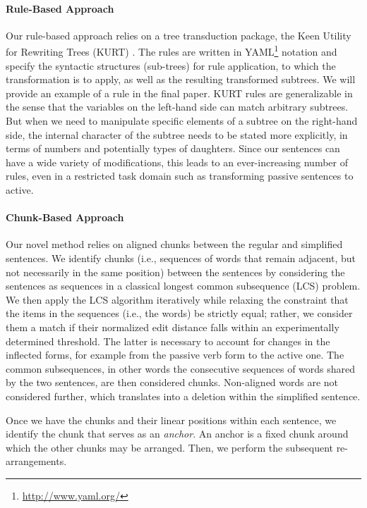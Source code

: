 \documentclass[a4paper,11pt]{article}
\begin{document}
\paragraph{Rule-Based Approach}
Our rule-based approach relies on a tree transduction package, the Keen Utility for Rewriting Trees (KURT) \cite{rudnick:12}. The rules are written in YAML\footnote{\url{http://www.yaml.org/}} notation and specify the syntactic structures (sub-trees) for rule application, to which the transformation is to apply, as well as the resulting transformed subtrees.  We will provide an example of a rule in the final paper.
KURT rules are generalizable in the sense that the variables on the left-hand side can match arbitrary subtrees.  But when we need to manipulate specific elements of a subtree on the right-hand side, the internal character of the subtree needs to be stated more explicitly, in terms of numbers and potentially types of daughters.  Since our sentences can have a wide variety of modifications, this leads to an ever-increasing number of rules, even in a restricted task domain such as transforming passive sentences to active.

\paragraph{Chunk-Based Approach}


Our novel method relies on aligned chunks between the regular and simplified sentences.  We identify chunks (i.e., sequences of words that remain adjacent, but not necessarily in the same position) between the sentences by considering the sentences as sequences in a classical longest common subsequence (LCS) problem. We then apply the LCS algorithm \cite{hirschberg:75} iteratively while relaxing the constraint that the items in the sequences (i.e., the words) be strictly equal; rather, we consider them a match if their normalized edit distance \cite{levenshtein:66} falls within an experimentally determined threshold. The latter is necessary to account for changes in the inflected forms, for example from the passive verb form to the active one. The common subsequences, in other words the consecutive sequences of words shared by the two sentences, are then considered chunks. Non-aligned words are not considered further, which translates into a deletion within the simplified sentence.


Once we have the chunks and their linear positions within each sentence, we identify the chunk that serves as an \textit{anchor}. An anchor  is a fixed chunk around which the other chunks may be arranged. Then, we perform the subsequent re-arrangements.  %
\end{document}
